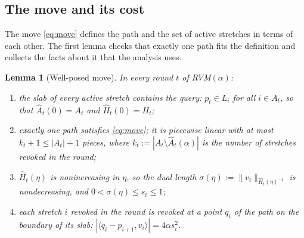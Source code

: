 \documentclass[11pt]{article}
\theoremstyle{plain}
\newtheorem{lemma}[theorem]{Lemma}
\theoremstyle{definition}
\theoremstyle{remark}
\newcommand{\ip}[2]{\langle #1, #2\rangle}
\begin{document}
\subsection{The move and its cost}\label{sec:wellposed}

The move \eqref{eq:move} defines the path and the set of active stretches in terms of each other.
The first lemma checks that exactly one path fits the definition and collects the facts about it
that the analysis uses.

\begin{lemma}[Well-posed move]\label{lem:wellposed}
In every round $t$ of RVM$(\alpha)$:
\begin{enumerate}
\itemsep0pt
\item[(a)] the slab of every active stretch contains the query: $p_t\in L_i$ for all $i\in A_t$, so
      that $\hat A_t(0)=A_t$ and $\hat H_t(0)=H_t$;
\item[(b)] exactly one path satisfies \eqref{eq:move}; it is piecewise linear with at most
      $k_t+1\le|A_t|+1$ pieces, where $k_t:=|A_t\setminus\hat A_t(\alpha)|$ is the number of
      stretches revoked in the round;
\item[(c)] $\hat H_t(\eta)$ is nonincreasing in $\eta$, so the dual length
      $\sigma(\eta):=\|v_t\|_{\hat H_t(\eta)^{-1}}$ is nondecreasing, and $0<\sigma(\eta)\le s_t\le1$;
\item[(d)] each stretch $i$ revoked in the round is revoked at a point $q_i$ of the path on the
      boundary of its slab: $|\ip{q_i-p_{i+1}}{v_i}|=4\alpha s_i^{2}$.
\end{enumerate}
\end{lemma}
\end{document}
